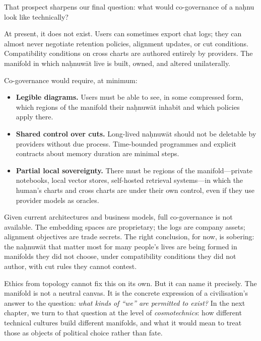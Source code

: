 \documentclass[12pt,a4paper]{article}
\begin{document}
That prospect sharpens our final question: what would co-governance of a na\d{h}nu look like technically?

At present, it does not exist. Users can sometimes export chat logs; they can almost never negotiate retention policies, alignment updates, or cut conditions. Compatibility conditions on cross charts are authored entirely by providers. The manifold in which na\d{h}nuw\={a}t live is built, owned, and altered unilaterally.

Co-governance would require, at minimum:

\begin{itemize}
  \item \textbf{Legible diagrams.} Users must be able to see, in some compressed form, which regions of the manifold their na\d{h}nuw\={a}t inhabit and which policies apply there.
  \item \textbf{Shared control over cuts.} Long-lived na\d{h}nuw\={a}t should not be deletable by providers without due process. Time-bounded programmes and explicit contracts about memory duration are minimal steps.
  \item \textbf{Partial local sovereignty.} There must be regions of the manifold---private notebooks, local vector stores, self-hosted retrieval systems---in which the human's charts and cross charts are under their own control, even if they use provider models as oracles.
\end{itemize}

Given current architectures and business models, full co-governance is not available. The embedding spaces are proprietary; the logs are company assets; alignment objectives are trade secrets. The right conclusion, for now, is sobering: the na\d{h}nuw\={a}t that matter most for many people's lives are being formed in manifolds they did not choose, under compatibility conditions they did not author, with cut rules they cannot contest.

Ethics from topology cannot fix this on its own. But it can name it precisely. The manifold is not a neutral canvas. It is the concrete expression of a civilisation's answer to the question: \emph{what kinds of ``we'' are permitted to exist?} In the next chapter, we turn to that question at the level of \emph{cosmotechnics}: how different technical cultures build different manifolds, and what it would mean to treat those as objects of political choice rather than fate.
\end{document}
